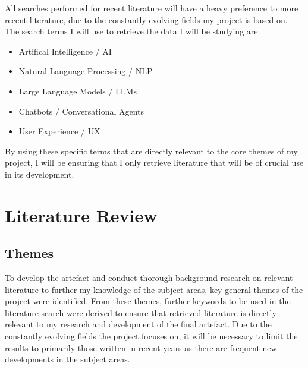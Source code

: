 \documentclass[12pt]{report}
\begin{document}
    \noindent 
    All searches performed for recent literature will have a heavy preference 
    to more recent literature, due to the constantly evolving fields my project is based on. 
    The search terms I will use to retrieve the data I will be studying are:

    \begin{itemize}
        \item Artifical Intelligence / AI 
        \item Natural Language Processing / NLP
        \item Large Language Models / LLMs
        \item Chatbots / Conversational Agents
        \item User Experience / UX
    \end{itemize}

    \noindent
    By using these specific terms that are directly relevant to the core themes of my project,
    I will be ensuring that I only retrieve literature that will be of crucial use in its 
    development.


    \chapter{Literature Review}

    \section{Themes}

    To develop the artefact and conduct thorough background research on relevant literature to further my 
    knowledge of the subject areas, key general themes of the project were identified. From these themes, further 
    keywords to be used in the literature search were derived to ensure that retrieved literature is directly relevant 
    to my research and development of the final artefact. Due to the constantly evolving fields the project focuses 
    on, it will be necessary to limit the results to primarily those written in recent years as there are 
    frequent new developments in the subject areas.
\end{document}
